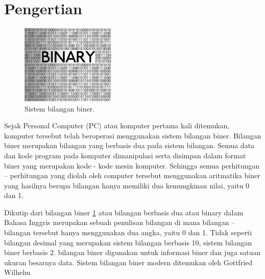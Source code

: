 


%

\section{Pengertian}

\begin{figure}[ht]
\centerline{\includegraphics[width=0.4\textwidth]{figures/biner.jpg}}
\caption{Sistem bilangan biner.}
\label{biner}
\end{figure}

Sejak Personal Computer (PC) atau komputer pertama kali ditemukan, komputer tersebut telah beroperasi menggunakan sistem bilangan biner. Bilangan biner merupakan bilangan yang berbasis dua pada sistem bilangan. Semua data dan kode program pada komputer dimanipulasi serta disimpan dalam format biner yang merupakan kode - kode mesin komputer. Sehingga semua perhitungan – perhitungan yang diolah oleh computer tersebut menggunakan aritmatika biner yang hasilnya berupa bilangan hanya memiliki dua kemungkinan nilai, yaitu 0 dan 1.

Dikutip dari \cite{hutahaean2015konsep} bilangan biner \ref{biner} atau bilangan berbasis dua atau binary dalam Bahasa Inggris merupakan sebuah penulisan bilangan di mana bilangan – bilangan tersebut hanya menggunakan dua angka, yaitu 0 dan 1. Tidak seperti bilangan desimal yang merupakan sistem bilangan berbasis 10, sistem bilangan biner berbasis 2. bilangan biner digunakan untuk informasi biner dan juga satuan ukuran besarnya data. Sistem bilangan biner modern ditemukan oleh Gottfried Wilhelm

